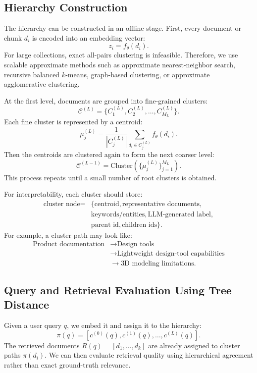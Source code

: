 \documentclass[11pt]{article}
\begin{document}
\subsection{Hierarchy Construction}

The hierarchy can be constructed in an offline stage. First, every document or chunk $d_i$ is encoded into an embedding vector:
\[
z_i = f_{\theta}(d_i).
\]
For large collections, exact all-pairs clustering is infeasible. Therefore, we use scalable approximate methods such as approximate nearest-neighbor search, recursive balanced $k$-means, graph-based clustering, or approximate agglomerative clustering.

At the first level, documents are grouped into fine-grained clusters:
\[
\mathcal{C}^{(L)} =
\{C^{(L)}_1, C^{(L)}_2, \ldots, C^{(L)}_{M_L}\}.
\]
Each fine cluster is represented by a centroid:
\[
\mu_j^{(L)} =
\frac{1}{|C^{(L)}_j|}
\sum_{d_i \in C^{(L)}_j} f_{\theta}(d_i).
\]
Then the centroids are clustered again to form the next coarser level:
\[
\mathcal{C}^{(L-1)} =
\text{Cluster}\left(\{\mu_j^{(L)}\}_{j=1}^{M_L}\right).
\]
This process repeats until a small number of root clusters is obtained.

For interpretability, each cluster should store:
\[
\begin{aligned}
\text{cluster node} =
&\{\text{centroid}, \text{representative documents}, \\
&\text{keywords/entities}, \text{LLM-generated label}, \\
&\text{parent id}, \text{children ids}\}.
\end{aligned}
\]
For example, a cluster path may look like:
\[
\begin{aligned}
\text{Product documentation}
&\rightarrow \text{Design tools} \\
&\rightarrow \text{Lightweight design-tool capabilities} \\
&\rightarrow \text{3D modeling limitations}.
\end{aligned}
\]

\subsection{Query and Retrieval Evaluation Using Tree Distance}

Given a user query $q$, we embed it and assign it to the hierarchy:
\[
\pi(q) = [c^{(0)}(q), c^{(1)}(q), \ldots, c^{(L)}(q)].
\]
The retrieved documents $R(q) = [d_1, \ldots, d_k]$ are already assigned to cluster paths $\pi(d_i)$. We can then evaluate retrieval quality using hierarchical agreement rather than exact ground-truth relevance.
\end{document}
